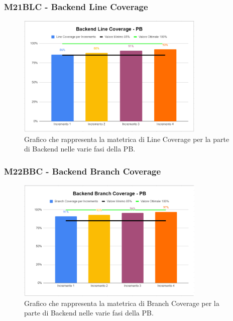 \subsubsection{M21BLC - Backend Line Coverage}
\begin{figure}[H]
    \centering\includegraphics[width=0.8\textwidth, height=0.8\textheight,keepaspectratio]{images/PB-Backend-Line.png}
    \caption{Grafico che rappresenta la matetrica di Line Coverage per la parte di Backend nelle varie fasi della PB.}
\end{figure}    

\subsubsection{M22BBC - Backend Branch Coverage}
\begin{figure}[H]
  \centering\includegraphics[width=0.8\textwidth, height=0.8\textheight,keepaspectratio]{images/PB-Backend-Branch.png}
  \caption{Grafico che rappresenta la matetrica di Branch Coverage per la parte di Backend nelle varie fasi della PB.}
\end{figure}    
 
